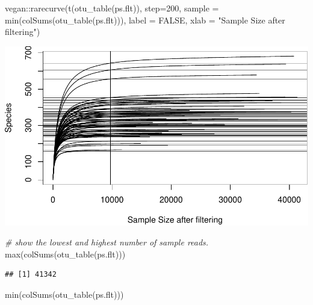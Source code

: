 \documentclass[
]{book}
\newenvironment{Shaded}{\begin{snugshade}}{\end{snugshade}}
\newcommand{\AttributeTok}[1]{\textcolor[rgb]{0.77,0.63,0.00}{#1}}
\newcommand{\CommentTok}[1]{\textcolor[rgb]{0.56,0.35,0.01}{\textit{#1}}}
\newcommand{\ConstantTok}[1]{\textcolor[rgb]{0.00,0.00,0.00}{#1}}
\newcommand{\DecValTok}[1]{\textcolor[rgb]{0.00,0.00,0.81}{#1}}
\newcommand{\FunctionTok}[1]{\textcolor[rgb]{0.00,0.00,0.00}{#1}}
\newcommand{\NormalTok}[1]{#1}
\newcommand{\SpecialCharTok}[1]{\textcolor[rgb]{0.00,0.00,0.00}{#1}}
\newcommand{\StringTok}[1]{\textcolor[rgb]{0.31,0.60,0.02}{#1}}
\begin{document}
\hfill\break

\begin{Shaded}
\begin{Highlighting}[]
\NormalTok{vegan}\SpecialCharTok{::}\FunctionTok{rarecurve}\NormalTok{(}\FunctionTok{t}\NormalTok{(}\FunctionTok{otu\_table}\NormalTok{(ps.flt)), }
                 \AttributeTok{step=}\DecValTok{200}\NormalTok{, }\AttributeTok{sample =} \FunctionTok{min}\NormalTok{(}\FunctionTok{colSums}\NormalTok{(}\FunctionTok{otu\_table}\NormalTok{(ps.flt))), }
                 \AttributeTok{label =} \ConstantTok{FALSE}\NormalTok{, }\AttributeTok{xlab =} \StringTok{"Sample Size after filtering"}\NormalTok{) }
\end{Highlighting}
\end{Shaded}

\includegraphics{gitbook-demo_files/figure-latex/rarefaction-1.pdf}

\begin{Shaded}
\begin{Highlighting}[]
\CommentTok{\# show the lowest and highest number of sample reads.  }
\FunctionTok{max}\NormalTok{(}\FunctionTok{colSums}\NormalTok{(}\FunctionTok{otu\_table}\NormalTok{(ps.flt)))}
\end{Highlighting}
\end{Shaded}

\begin{verbatim}
## [1] 41342
\end{verbatim}

\begin{Shaded}
\begin{Highlighting}[]
\FunctionTok{min}\NormalTok{(}\FunctionTok{colSums}\NormalTok{(}\FunctionTok{otu\_table}\NormalTok{(ps.flt)))}
\end{Highlighting}
\end{Shaded}
\end{document}
